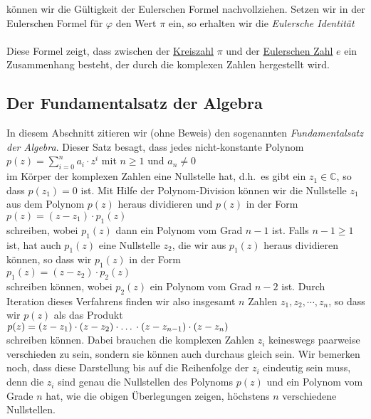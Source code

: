 k\"{o}nnen wir die G\"{u}ltigkeit der Eulerschen Formel nachvollziehen.  Setzen wir in der Eulerschen Formel
f\"{u}r $\varphi$ den Wert $\pi$ ein, so erhalten wir die {\emph{\color{blue}Eulersche Identit\"{a}t}}
\\[0.2cm]
\hspace*{1.3cm}
\colorbox{red}{}
\\[0.2cm]
Diese Formel zeigt, dass zwischen der \href{https://de.wikipedia.org/wiki/Kreiszahl}{Kreiszahl} $\pi$ und der 
\href{https://de.wikipedia.org/wiki/Eulersche_Zahl}{Eulerschen Zahl} $e$ ein Zusammenhang besteht,
der durch die komplexen Zahlen hergestellt wird.


\subsection{Der Fundamentalsatz der Algebra}
In diesem Abschnitt zitieren wir (ohne Beweis) den sogenannten \emph{\color{blue}Fundamentalsatz der Algebra}.  Dieser Satz
besagt, dass jedes nicht-konstante Polynom  
\\[0.2cm]
\hspace*{1.3cm}
$p(z) = \sum\limits_{i=0}^n a_i \cdot z^i$ \quad mit $n \geq 1$ und $a_n \not=0$
\\[0.2cm]
{\color{red}im K\"{o}rper der komplexen Zahlen} eine Nullstelle hat, d.h.~es gibt ein $z_1 \in \mathbb{C}$, so dass
$p(z_1) = 0$ ist.  Mit Hilfe der Polynom-Division k\"{o}nnen wir die Nullstelle $z_1$ aus dem Polynom $p(z)$
heraus dividieren und $p(z)$ in der Form
\\[0.2cm]
\hspace*{1.3cm}
$p(z) = (z - z_1) \cdot p_1(z)$
\\[0.2cm]
schreiben, wobei $p_1(z)$ dann ein Polynom vom Grad $n-1$ ist.  Falls $n-1 \geq 1$ ist, hat auch
$p_1(z)$ eine Nullstelle $z_2$, die wir aus $p_1(z)$ heraus dividieren k\"{o}nnen, so dass wir $p_1(z)$
in der Form
\\[0.2cm]
\hspace*{1.3cm}
$p_1(z) = (z- z_2) \cdot p_2(z)$
\\[0.2cm]
schreiben k\"{o}nnen, wobei $p_2(z)$ ein Polynom vom Grad $n-2$ ist.  Durch Iteration dieses Verfahrens
finden wir also insgesamt $n$ Zahlen $z_1, z_2, \cdots, z_n$, so dass wir $p(z)$ als das Produkt
\\[0.2cm]
\hspace*{1.3cm}
$p(z) = (z-z_1) \cdot (z-z_2) \cdot \mbox{\dots} \cdot (z-z_{n-1}) \cdot (z - z_n)$
\\[0.2cm]
schreiben k\"{o}nnen.  Dabei brauchen die komplexen Zahlen $z_i$ keineswegs paarweise verschieden zu sein,
sondern sie k\"{o}nnen auch durchaus gleich sein.  Wir bemerken noch, dass diese Darstellung bis auf die
Reihenfolge der $z_i$ eindeutig sein muss, denn die $z_i$ sind genau die Nullstellen des Polynoms
$p(z)$ und ein Polynom vom Grade $n$ hat, wie die obigen \"{U}berlegungen zeigen, h\"{o}chstens $n$
verschiedene Nullstellen.
\vspace*{0.2cm} 

